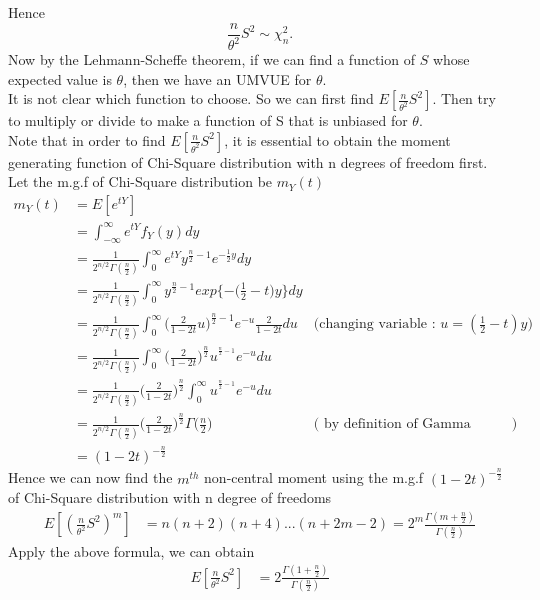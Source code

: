 \documentclass[a4paper,11pt]{article}
\begin{document}
\begin{enumerate}[(a)]
\[			\]
			Hence
			\[
			\frac{n}{\theta^2}S^2 \sim \chi^2_n.
			\]
			Now by the Lehmann-Scheffe theorem, if we can find a function of $S$ whose expected value is $\theta$, then we have an UMVUE for $\theta$.
			\\It is not clear which function to choose. So we can first find $E[\frac{n}{\theta^2}S^2]$. Then try to multiply or divide to make a function of S that is unbiased for $\theta$.
			\\Note that in order to find $E[\frac{n}{\theta^2}S^2]$, it is essential to obtain the moment generating function of Chi-Square distribution with n degrees of freedom first.
			Let the m.g.f of Chi-Square distribution be $m_Y(t)$
			\begin{align*}
			m_{Y}(t) &= E[e^{tY}]\\
			&= \int^\infty_{-\infty} e^{tY} f_Y (y) dy\\
			&= \frac{1}{2^{n/2}\Gamma(\frac{n}{2})} \int^\infty_0 e^{tY} y^{\frac{n}{2}-1} e^{-\frac{1}{2}y} dy\\
			&= \frac{1}{2^{n/2}\Gamma(\frac{n}{2})} \int^\infty_0  y^{\frac{n}{2}-1} exp\bigg\{{-\bigg(\frac{1}{2}-t\bigg)y}\bigg\} dy\\
			&= \frac{1}{2^{n/2}\Gamma(\frac{n}{2})} \int^\infty_0  \bigg(\frac{2}{1-2t}u \bigg)^{\frac{n}{2}-1} e^{-u}\frac{2}{1-2t}du & \bigg( \mbox{changing variable : }u= (\frac{1}{2}-t)y\bigg)\\
			&= \frac{1}{2^{n/2}\Gamma(\frac{n}{2})} \int^\infty_0  \bigg(\frac{2}{1-2t} \bigg)^{\frac{n}{2}}u^{^{\frac{n}{2}-1}} e^{-u} du \\
			&=\frac{1}{2^{n/2}\Gamma(\frac{n}{2})} \bigg(\frac{2}{1-2t} \bigg)^{\frac{n}{2}} \int^\infty_0  u^{^{\frac{n}{2}-1}} e^{-u} du \\
			&=\frac{1}{2^{n/2}\Gamma(\frac{n}{2})} \bigg(\frac{2}{1-2t} \bigg)^{\frac{n}{2}} \Gamma\bigg(\frac{n}{2}\bigg)  & \bigg(\mbox{ by definition of Gamma function}\bigg)\\
			&=(1-2t)^{-\frac{n}{2}}
			\end{align*}
			Hence we can now find the $m^{th}$ non-central moment using the m.g.f $ (1-2t)^{-\frac{n}{2}}$ of Chi-Square distribution with n degree of freedoms
			\begin{align*}
			E[(\frac{n}{\theta^2}S^2)^m]&=   n(n+2)(n+4)...(n+2m-2) = 2^m \frac{\Gamma(m+\frac{n}{2})}{\Gamma(\frac{n}{2})}
			\end{align*}
			Apply the above formula, we can obtain 
			\begin{align*}
			E[\frac{n}{\theta^2}S^2]&=  2 \frac{\Gamma(1+\frac{n}{2})}{\Gamma(\frac{n}{2})}\\

\end{align*}
\end{enumerate}
\end{document}
